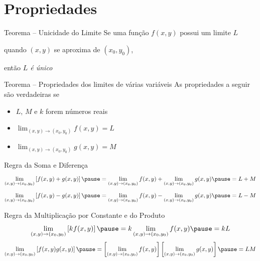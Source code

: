 \section{Propriedades}

\begin{frame}{Teorema -- Unicidade do Limite}
  Se uma função \(f(x, y)\) possui um limite $L$

  quando \((x, y)\) se aproxima de \((x_0, y_0)\),

  \pause
  então \emph{$L$ é único}
\end{frame}

\begin{frame}{Teorema -- Propriedades dos limites de várias variáveis}
  As propriedades a seguir são verdadeiras se
  \begin{itemize}[<+->]
    \setlength\itemsep{1.5em}
    \item $L$, $M$ e $k$ forem números reais
    \item \(\lim_{(x, y)\to(x_0, y_0)} f(x, y) = L\)
    \item \(\lim_{(x, y)\to(x_0, y_0)} g(x, y) = M\)
  \end{itemize}
\end{frame}

\begin{frame}{Regra da Soma e Diferença}
  \[
    \lim_{(x, y)\to(x_0, y_0)} \left[f(x, y) + g(x, y)\right]
    \pause =
    \lim_{(x, y)\to(x_0, y_0)} f(x, y) + \lim_{(x, y)\to(x_0, y_0)} g(x, y)
    \pause =
    L + M
  \]
  \pause
  \vspace{\baselineskip}
  \[
    \lim_{(x, y)\to(x_0, y_0)} \left[f(x, y) - g(x, y)\right]
    \pause =
    \lim_{(x, y)\to(x_0, y_0)} f(x, y) - \lim_{(x, y)\to(x_0, y_0)} g(x, y)
    \pause =
    L - M
  \]
\end{frame}

\begin{frame}{Regra da Multiplicação por Constante e do Produto}
  \[
    \lim_{(x, y)\to(x_0, y_0)} \left[k f(x, y)\right]
    \pause =
    k \lim_{(x, y)\to(x_0, y_0)} f(x, y)
    \pause =
    k L
  \]
  \pause
  \vspace{\baselineskip}
  \[
    \lim_{(x, y)\to(x_0, y_0)} \left[f(x, y) g(x, y)\right]
    \pause =
    \left[\lim_{(x, y)\to(x_0, y_0)} f(x, y) \right]
    \left[\lim_{(x, y)\to(x_0, y_0)} g(x, y) \right]
    \pause =
    LM
  \]
\end{frame}

